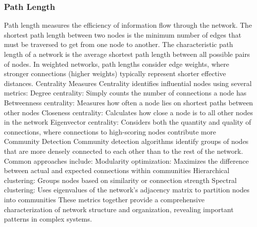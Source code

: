 \begin{figure}[h]
\begin{tcolorbox}
  \label{fig:clustercoeff}
 \end{tcolorbox}
\end{figure}

\subsubsection*{Path Length}
Path length measures the efficiency of information flow through the network. The shortest path length between two nodes is the minimum number of edges that must be traversed to get from one node to another. The characteristic path length of a network is the average shortest path length between all possible pairs of nodes. In weighted networks, path lengths consider edge weights, where stronger connections (higher weights) typically represent shorter effective distances.
Centrality Measures
Centrality identifies influential nodes using several metrics:
Degree centrality: Simply counts the number of connections a node has
Betweenness centrality: Measures how often a node lies on shortest paths between other nodes
Closeness centrality: Calculates how close a node is to all other nodes in the network
Eigenvector centrality: Considers both the quantity and quality of connections, where connections to high-scoring nodes contribute more
Community Detection
Community detection algorithms identify groups of nodes that are more densely connected to each other than to the rest of the network. Common approaches include:
Modularity optimization: Maximizes the difference between actual and expected connections within communities
Hierarchical clustering: Groups nodes based on similarity or connection strength
Spectral clustering: Uses eigenvalues of the network's adjacency matrix to partition nodes into communities
These metrics together provide a comprehensive characterization of network structure and organization, revealing important patterns in complex systems.



